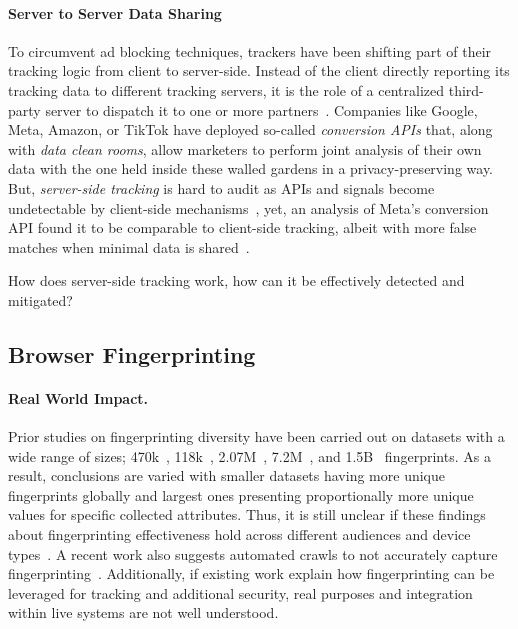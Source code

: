 \paragraph{Server to Server Data Sharing}
%
To circumvent ad blocking techniques, trackers have been shifting part of their tracking logic from client to server-side.
%
Instead of the client directly reporting its tracking data to different tracking servers, it is the role of a centralized third-party server to dispatch it to one or more partners~\cite{fisherImprovePerformanceSecurity2020}.
%
Companies like Google, Meta, Amazon, or TikTok have deployed so-called \textit{conversion APIs} that, along with \textit{data clean rooms}, allow marketers to perform joint analysis of their own data with the one held inside these walled gardens in a privacy-preserving way.
%
But, \textit{server-side tracking} is hard to audit as APIs and signals become undetectable by client-side mechanisms~\cite{fouadDevilDetailsDetection2024}, yet, an analysis of Meta's conversion API found it to be comparable to client-side tracking, albeit with more false matches when minimal data is shared~\cite{fraihiClientsideServersideTracking2024}.
\begin{opbox}
How does server-side tracking work, how can it be effectively detected and mitigated?
\end{opbox}


\subsection{Browser Fingerprinting}

\paragraph{Real World Impact.}
Prior studies on fingerprinting diversity have been carried out on datasets with a wide range of sizes; 470k~\cite{eckersleyHowUniqueYour2010}, 118k~\cite{laperdrixBeautyBeastDiverting2016}, 2.07M~\cite{gomez-boixHidingCrowdAnalysis2018}, 7.2M~\cite{liWhoTouchedMy2020}, and 1.5B~\cite{wuHimManyFaces2023} fingerprints. As a result, conclusions are varied with smaller datasets having more unique fingerprints globally and largest ones presenting proportionally more unique values for specific collected attributes. Thus, it is still unclear if these findings about fingerprinting effectiveness hold across different audiences and device types~\cite{berkeHowUniqueWhose2025}. A recent work also suggests automated crawls to not accurately capture fingerprinting~\cite{muthu2025beyond}. Additionally, if existing work explain how fingerprinting can be leveraged for tracking and additional security, real purposes and integration within live systems are not well understood.

